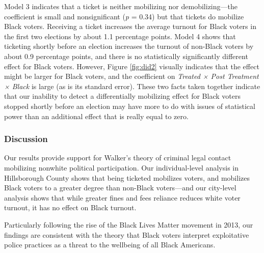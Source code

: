 \documentclass[
  12pt,
]{article}
\begin{document}
Model 3 indicates that a ticket is neither mobilizing nor demobilizing---the coefficient is small and nonsignificant (\emph{p} = 0.34) but that tickets do mobilize Black voters. Receiving a ticket increases the average turnout for Black voters in the first two elections by about 1.1 percentage points. Model 4 shows that ticketing shortly before an election increases the turnout of non-Black voters by about 0.9 percentage points, and there is no statistically significantly different effect for Black voters. However, Figure \ref{fig:did2} visually indicates that the effect might be larger for Black voters, and the coefficient on \emph{Treated × Post Treatment × Black} is large (as is its standard error). These two facts taken together indicate that our inability to detect a differentially mobilizing effect for Black voters stopped shortly before an election may have more to do with issues of statistical power than an additional effect that is really equal to zero.

\hypertarget{discussion}{%
\subsubsection*{Discussion}\label{discussion}}

Our results provide support for Walker's theory of criminal legal contact mobilizing nonwhite political participation. Our individual-level analysis in Hillsborough County shows that being ticketed mobilizes voters, and mobilizes Black voters to a greater degree than non-Black voters---and our city-level analysis shows that while greater fines and fees reliance reduces white voter turnout, it has no effect on Black turnout.

Particularly following the rise of the Black Lives Matter movement in 2013, our findings are consistent with the theory that Black voters interpret exploitative police practices as a threat to the wellbeing of all Black Americans.
\end{document}
